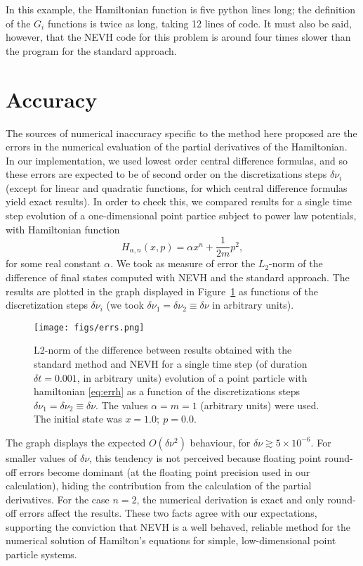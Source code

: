 \documentclass{iopart}
\begin{document}
In this example, the Hamiltonian function is five python lines long; the
definition of the $G_i$ functions is twice as long, taking 12 lines of code. 
It must also be said, however, that the NEVH code for this problem is around
four times slower than the program for the standard approach.

\section{Accuracy}
The sources of numerical inaccuracy specific to the method here proposed are the
errors in the numerical evaluation of the partial derivatives of the
Hamiltonian. In our implementation, we used lowest order central difference
formulas, and so these errors are expected to be of second order on the
discretizations steps $\delta\nu_i$ (except for linear and quadratic functions,
for which central difference formulas yield exact results).
In order to check this, we compared results 
 for a single
time step evolution of a one-dimensional point partice subject to power law
potentials, 
with Hamiltonian function
\begin{equation}\label{eq:errh}
  H_{\alpha,n}(x,p)=\alpha x^n+\frac{1}{2m}p^2,
\end{equation}
for some real constant $\alpha$.
We took as measure of error the $L_2$-norm of the difference of final states
computed with NEVH and the standard approach.
The results are plotted in the graph displayed in Figure~\ref{fig:e} as 
functions of the discretization steps $\delta\nu_i$ (we
took $\delta\nu_1=\delta\nu_2\equiv\delta\nu$ in arbitrary units).
\begin{figure}[htb]
  \centering
    \texttt{[image: figs/errs.png]}
  \par
  \caption{\label{fig:e}L2-norm of the difference between results obtained
    with the standard method and NEVH for a single time step (of duration
    $\delta t=0.001$, in arbitrary units) evolution of a point particle with
    hamiltonian \eqref{eq:errh} as a function of the discretizations steps
    $\delta\nu_1=\delta\nu_2\equiv\delta\nu$. The values $\alpha=m=1$ (arbitrary
    units) were used. The initial state was $x=1.0;\ p=0.0$.}
\end{figure}

The graph displays the expected $O(\delta\nu^2)$ behaviour, for
$\delta\nu\gtrsim5\times10^{-6}$. For smaller values of $\delta\nu$, this tendency is
not perceived because floating point round-off errors become dominant (at the
floating point precision used in our calculation), hiding the contribution from
the calculation of the partial derivatives. For the case $n=2$, the numerical
derivation is exact and only round-off errors affect the results. These two
facts agree with our expectations, supporting the conviction that NEVH is a
well behaved, reliable method for the numerical solution of Hamilton's equations
for simple, low-dimensional point particle systems.
\end{document}
